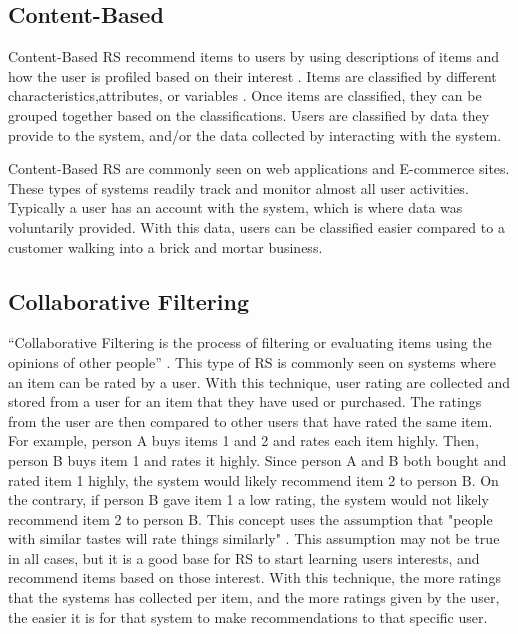 \documentclass[sigconf]{acmart}
\begin{document}
\subsection{Content-Based}
Content-Based RS recommend items to users by using descriptions of items and how the user is profiled based on
their interest \cite {Pazzani2007}. Items are classified by different characteristics,attributes, or variables
\cite{Pazzani2007}. Once items are classified, they can be grouped together based on the classifications. Users
are classified by data they provide to the system, and/or the data collected by interacting with the system. 

Content-Based RS are commonly seen on web applications and E-commerce sites. These types of systems readily
track and monitor almost all user activities. Typically a user has an account with the system, which is where
data was voluntarily provided. With this data, users can be classified easier compared to a customer walking
into a brick and mortar business.

\subsection{Collaborative Filtering}
``Collaborative Filtering is the process of filtering or evaluating items using the opinions of other people''
\cite{Schafer2007}. This type of RS is commonly seen on systems where an item can be rated by a user. With this
technique, user rating are collected and stored from a user for an item that they have used or purchased. The
ratings from the user are then compared to other users that have rated the same item. For example, person A
buys items 1 and 2 and rates each item highly. Then, person B buys item 1 and rates it highly. Since person A
and B both bought and rated item 1 highly, the system would likely recommend item 2 to person B. On the
contrary, if person B gave item 1 a low rating, the system would not likely recommend item 2 to person B. This
concept uses the assumption that "people with similar tastes will rate things similarly" \cite{Schafer2007}.
This assumption may not be true in all cases, but it is a good base for RS to start learning users interests,
and recommend items based on those interest. With this technique, the more ratings that the systems has
collected per item, and the more ratings given by the user, the easier it is for that system to make
recommendations to that specific user.
\end{document}
